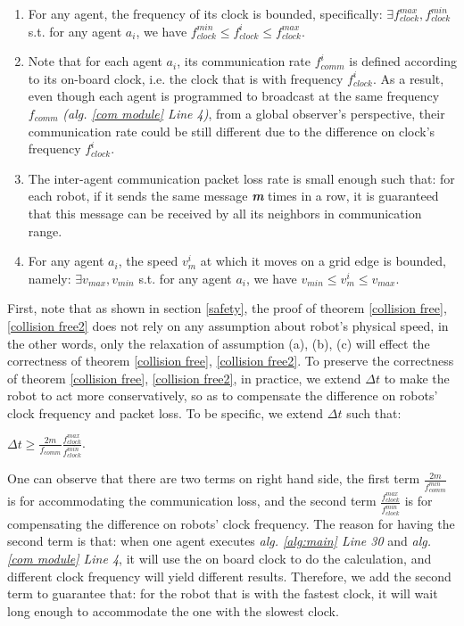 \documentclass[journal]{IEEEtran}
\begin{document}
\begin{enumerate}[label=(\alph*), leftmargin=*]
   \item  For any agent, the frequency of its clock is bounded, specifically: $\exists f_{clock}^{max}, f_{clock}^{min}$ s.t. for any agent $a_i$, we have $f_{clock}^{min}\leq f_{clock}^i\leq f_{clock}^{max}$.

   \item  Note that for each agent $a_i$, its communication rate $f_{comm}^i$ is defined according to its on-board clock, i.e. the clock that is with frequency $f_{clock}^i$. As a result, even though each agent is programmed to broadcast at the same frequency $f_{comm}$ \textit{(alg. \ref{com module} Line 4)}, from a global observer's perspective, their communication rate could be still different due to the difference on clock's frequency $f_{clock}^i$. 

\item   The inter-agent communication packet loss rate is small enough such that: for each robot, if it sends the same message \textbf{\textit{m}} times in a row, it is guaranteed that this message can be received by all its neighbors in communication range.
 \item For any agent $a_i$, the speed $v_m^i$ at which it moves on a grid edge is bounded, namely: $\exists v_{max}, v_{min}$ s.t. for any agent $a_i$, we have $v_{min}\leq v_m^i\leq v_{max}$.
\end{enumerate}

First, note that as shown in section \ref{safety}, the proof of theorem \ref{collision free}, \ref{collision free2} does not rely on any assumption about robot's physical speed, in the other words, only the relaxation of assumption (a), (b), (c) will effect the correctness of theorem \ref{collision free}, \ref{collision free2}. To preserve the correctness of theorem \ref{collision free}, \ref{collision free2}, in practice, we extend $\Delta t$ to make the robot to act more conservatively, so as to compensate the difference on robots' clock frequency and packet loss. To be specific, we extend $\Delta t$ such that:

\begin{center}$\Delta t \geq \frac{2m}{f_{comm}}\frac{f_{clock}^{max}}{f_{clock}^{min}}$. \end{center}


One can observe that there are two terms on right hand side, the first term $\frac{2m}{f_{comm}^{min}}$ is for accommodating the communication loss, and the second term $\frac{f_{clock}^{max}}{f_{clock}^{min}}$ is for compensating the difference on robots' clock frequency. The reason for having the second term is that: when one agent executes \textit{alg. \ref{alg:main} Line 30} and \textit{alg. \ref{com module} Line 4}, it will use the on board clock to do the calculation, and different clock frequency will yield different results. Therefore, we add the second term to guarantee that: for the robot that is with the fastest clock, it will wait long enough to accommodate the one with the slowest clock. 
\end{document}

